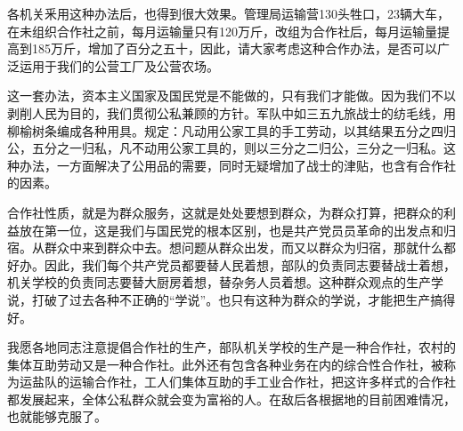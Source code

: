 各机关釆用这种办法后，也得到很大效果。管理局运输营130头牲口，23辆大车，在未组织合作社之前，每月运输量只有120万斤，改组为合作社后，每月运输量提高到185万斤，增加了百分之五十，因此，请大家考虑这种合作办法，是否可以广泛运用于我们的公营工厂及公营农场。

这一套办法，资本主义国家及国民党是不能做的，只有我们才能做。因为我们不以剥削人民为目的，我们贯彻公私兼顾的方针。军队中如三五九旅战士的纺毛线，用柳榆树条编成各种用具。规定：凡动用公家工具的手工劳动，以其结果五分之四归公，五分之一归私，凡不动用公家工具的，则以三分之二归公，三分之一归私。这种办法，一方面解决了公用品的需要，同时无疑增加了战士的津贴，也含有合作社的因素。

合作社性质，就是为群众服务，这就是处处要想到群众，为群众打算，把群众的利益放在第一位，这是我们与国民党的根本区别，也是共产党员员革命的出发点和归宿。从群众中来到群众中去。想问题从群众出发，而又以群众为归宿，那就什么都好办。因此，我们每个共产党员都要替人民着想，部队的负责同志要替战士着想，机关学校的负责同志要替大厨房着想，替杂务人员着想。这种群众观点的生产学说，打破了过去各种不正确的“学说”。也只有这种为群众的学说，才能把生产搞得好。

我愿各地同志注意提倡合作社的生产，部队机关学校的生产是一种合作社，农村的集体互助劳动又是一种合作社。此外还有包含各种业务在内的综合性合作社，被称为运盐队的运输合作社，工人们集体互助的手工业合作社，把这许多样式的合作社都发展起来，全体公私群众就会变为富裕的人。在敌后各根据地的目前困难情况，也就能够克服了。

